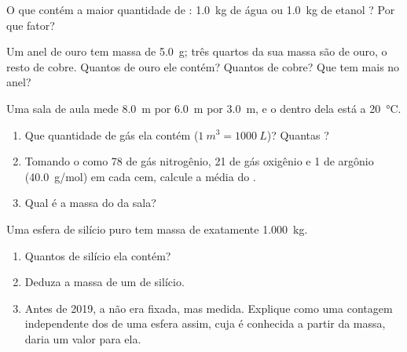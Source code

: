 \begin{exercise}[$\star\star$]\label{exo:g10:the-mole:11}
O que contém a maior quantidade de : \qty{1.0}{kg} de água
 ou \qty{1.0}{kg} de etanol ? Por que fator?
\end{exercise}

\begin{exercise}[$\star\star\star$]\label{exo:g10:the-mole:12}
Um anel de ouro tem massa de \qty{5.0}{g}; três quartos da sua massa
são de ouro, o resto de cobre. Quantos  de ouro ele contém?
Quantos  de cobre? Que  tem mais  no anel?
\end{exercise}

\begin{exercise}[$\star\star\star$]\label{exo:g10:the-mole:13}
Uma sala de aula mede \qty{8.0}{m} por \qty{6.0}{m} por \qty{3.0}{m}, e
o  dentro dela está a \qty{20}{\celsius}.
\begin{enumerate}
  \item Que quantidade de gás ela contém ($\qty{1}{m^3} =
        \qty{1000}{L}$)? Quantas ?
  \item Tomando o  como 78  de gás nitrogênio, 21 de gás
        oxigênio e 1 de argônio (\qty{40.0}{g/mol}) em cada cem, calcule
        a  média do .
  \item Qual é a massa do  da sala?
\end{enumerate}
\end{exercise}

\begin{exercise}[$\star\star\star$]\label{exo:g10:the-mole:14}
Uma esfera de silício puro tem massa de exatamente \qty{1.000}{kg}.
\begin{enumerate}
  \item Quantos  de silício ela contém?
  \item Deduza a massa de um  de silício.
  \item Antes de 2019, a  não era fixada, mas
        medida. Explique como uma contagem independente dos  de uma
        esfera assim, cuja  é conhecida a partir da
        massa, daria um valor para ela.
\end{enumerate}
\end{exercise}

